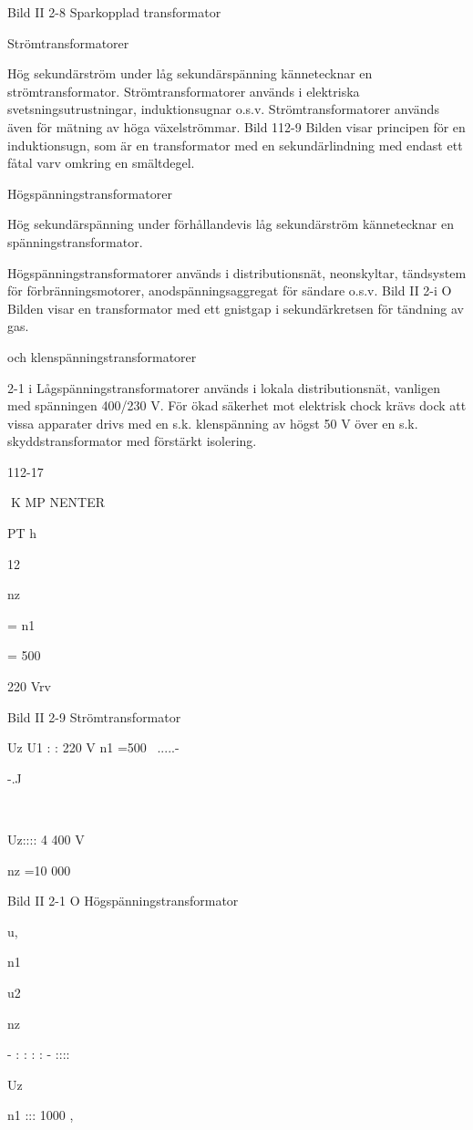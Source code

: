 {Bild II 2-8 Sparkopplad transformator

Strömtransformatorer

Hög sekundärström under låg sekundärspänning kännetecknar en strömtransformator.
Strömtransformatorer används i elektriska svetsningsutrustningar, induktionsugnar
o.s.v. Strömtransformatorer används även
för mätning av höga växelströmmar.
Bild 112-9
Bilden visar principen för en induktionsugn, som är en transformator med en sekundärlindning med endast ett fåtal varv omkring en smältdegel.

Högspänningstransformatorer

Hög sekundärspänning under förhållandevis låg sekundärström kännetecknar en
spänningstransformator.

Högspänningstransformatorer används i
distributionsnät, neonskyltar, tändsystem för
förbränningsmotorer, anodspänningsaggregat för sändare o.s.v.
Bild II 2-i O
Bilden visar en transformator med ett gnistgap i sekundärkretsen för tändning av gas.

och klenspänningstransformatorer

2-1 i
Lågspänningstransformatorer används i lokala distributionsnät, vanligen med spänningen 400/230 V. För ökad säkerhet mot
elektrisk chock krävs dock att vissa apparater drivs med en s.k. klenspänning av högst
50 V över en s.k. skyddstransformator med
förstärkt isolering.

112-17

K MP NENTER

PT
h

12

nz

= n1

= 500

220 Vrv

Bild II 2-9 Strömtransformator

Uz
U1 : : 220 V
n1 =500 ~.....-   

-.J

~

Uz:::: 4 400 V

nz =10 000

Bild II 2-1 O Högspänningstransformator

u,

n1

u2

nz

- : : : : - ::::

Uz

n1 ::: 1000 ,   

}
